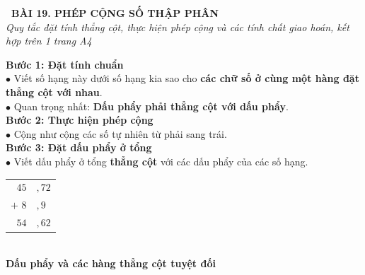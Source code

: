 \documentclass[14pt,a4paper,oneside]{extbook}
\begin{document}
\noindent
\begin{tcolorbox}[
  enhanced,
  colback=teal!8!white,
  colframe=teal!80!black,
  arc=3mm,
  boxrule=1.1pt,
  width=\linewidth,
  halign=center,
  top=2.2mm, bottom=2.2mm,
  left=3mm, right=3mm,
  drop fuzzy shadow
]
  {\large\bfseries\color{teal!95!black}\faBookmark\ BÀI 19. PHÉP CỘNG SỐ THẬP PHÂN}\\[2pt]
  {\scriptsize\color{black!75}\itshape Quy tắc đặt tính thẳng cột, thực hiện phép cộng và các tính chất giao hoán, kết hợp trên 1 trang A4}
\end{tcolorbox}

\vspace{3.2mm}
\noindent
\begin{minipage}[t]{0.58\textwidth}
  \begin{tcolorbox}[
    enhanced,
    title={\footnotesize\bfseries\color{white}\faKey\ 1. Quy tắc cộng hai số thập phân},
    colback=blue!2!white,
    colframe=blue!75!black,
    arc=2.5mm, boxrule=0.8pt, top=1.8mm, bottom=1.8mm, left=2.2mm, right=2.2mm
  ]
    \footnotesize
    \textbf{Bước 1: Đặt tính chuẩn}\\
    $\bullet$ Viết số hạng này dưới số hạng kia sao cho \textbf{các chữ số ở cùng một hàng đặt thẳng cột với nhau}.\\
    $\bullet$ Quan trọng nhất: \textbf{Dấu phẩy phải thẳng cột với dấu phẩy}.\\[2pt]
    \textbf{Bước 2: Thực hiện phép cộng}\\
    $\bullet$ Cộng như cộng các số tự nhiên từ phải sang trái.\\[2pt]
    \textbf{Bước 3: Đặt dấu phẩy ở tổng}\\
    $\bullet$ Viết dấu phẩy ở tổng \textbf{thẳng cột} với các dấu phẩy của các số hạng.
  \end{tcolorbox}
\end{minipage}%
\hfill
\begin{minipage}[t]{0.40\textwidth}
  \begin{tcolorbox}[
    enhanced,
    title={\footnotesize\bfseries\color{white}\faPencil\ Minh họa đặt tính},
    colback=teal!2!white,
    colframe=teal!75!black,
    arc=2.5mm, boxrule=0.8pt, top=1.8mm, bottom=1.8mm, left=1.5mm, right=1.5mm,
    halign=center
  ]
    \small
    \begin{tabular}{r@{\,}l}
      $45$&${,}72$ \\
      $+$ \quad $8$&${,}9$ \\ \hline
      $54$&${,}62$
    \end{tabular}\\[3pt]
    {\tiny\color{teal!95!black}\bfseries Dấu phẩy và các hàng thẳng cột tuyệt đối}
  \end{tcolorbox}
\end{minipage}
\end{document}
